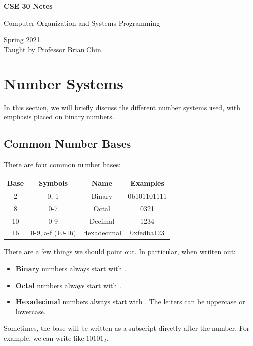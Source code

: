 \documentclass[letterpaper]{article}
\begin{document}
\begin{titlepage}
    \begin{center}
        \vspace*{1cm}
            
        \Huge
        \textbf{CSE 30 Notes}
            
        \vspace{0.5cm}
        \LARGE
        Computer Organization and Systems Programming
            
        \vspace{1.5cm}
            
        \vfill
            
        Spring 2021\\
        Taught by Professor Brian Chin
    \end{center}
\end{titlepage}


\newpage 

\begingroup
    \renewcommand\contentsname{Table of Contents}
    \tableofcontents
\endgroup

\newpage
{}

\section{Number Systems}
In this section, we will briefly discuss the different number systems used, with emphasis placed on binary numbers.

\subsection{Common Number Bases}
There are four common number bases:
\begin{center}
    \begin{tabular}{c|c|c|c}
        \textbf{Base} & \textbf{Symbols} & \textbf{Name} & \textbf{Examples} \\ 
        \hline 
        2 & 0, 1 & Binary & 0b101101111 \\ 
        8 & 0-7 & Octal & 0321 \\ 
        10 & 0-9 & Decimal & 1234 \\ 
        16 & 0-9, a-f (10-16) & Hexadecimal & 0xfedba123
    \end{tabular}
\end{center}

There are a few things we should point out. In particular, when written out:
\begin{itemize}
    \item \textbf{Binary} numbers always start with . 
    \item \textbf{Octal} numbers always start with .
    \item \textbf{Hexadecimal} numbers always start with . The letters can be uppercase or lowercase.
\end{itemize}
Sometimes, the base will be written as a subscript directly after the number. For example, we can write  like $10101_{2}$. 
\end{document}
